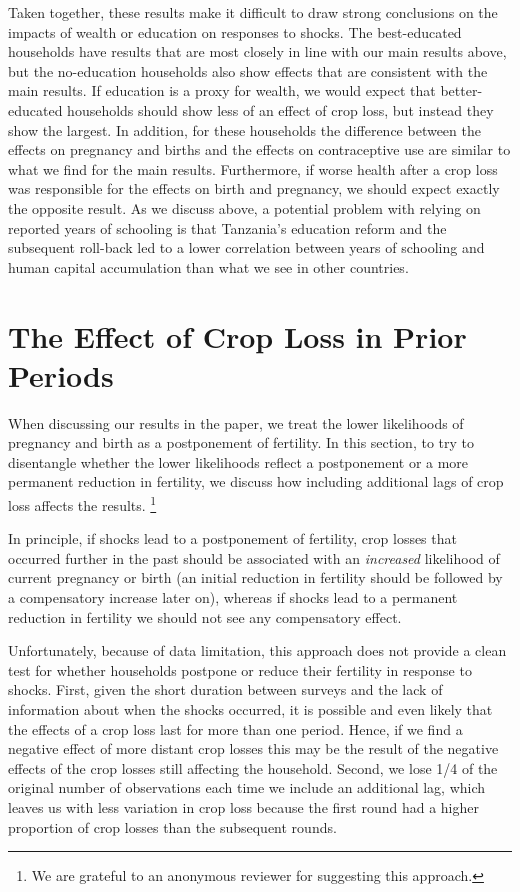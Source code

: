 \documentclass[letterpaper,12pt]{article}
\begin{document}
Taken together, these results make it difficult to draw strong
conclusions on the impacts of wealth or education on responses to shocks.
The best-educated households have results that are
most closely in line with our main results above, but 
the no-education households also show effects that are
consistent with the main results.
If education is a proxy for wealth, we would 
expect that better-educated households should show less
of an effect of crop loss, but instead they show the largest.
In addition, for these households the difference between
the effects on pregnancy and births and the effects on
contraceptive use are similar to what we find for the main results.
Furthermore, if worse health after a crop loss was responsible for the
effects on birth and pregnancy, we should expect exactly
the opposite result.
As we discuss above, a potential problem with relying on 
reported years of schooling is that Tanzania's education reform and the
subsequent roll-back led to a lower correlation between years of
schooling and human capital accumulation than what we see in other
countries.

\section{The Effect of Crop Loss in Prior Periods}

When discussing our results in the paper, we treat the 
lower likelihoods of pregnancy and birth as a postponement 
of fertility.
In this section, to try to disentangle whether the lower 
likelihoods reflect a postponement or a more permanent reduction 
in fertility, we discuss how including additional lags
of crop loss affects the results.%
\footnote{
We are grateful to an anonymous reviewer for suggesting 
this approach.
}

In principle, if shocks lead to a postponement of fertility,
crop losses that occurred further in the past should be
associated with an \emph{increased} likelihood of current pregnancy 
or birth (an initial reduction in fertility should be followed
by a compensatory increase later on), 
whereas if shocks lead to a permanent reduction in fertility we
should not see any compensatory effect.

Unfortunately, because of data limitation, this approach does not 
provide a clean test for whether households 
postpone or reduce their fertility in response to shocks.
First, given the short duration between surveys and the lack of 
information about when the shocks occurred, it is possible and
even likely that the effects of a crop loss last for more than one period.
Hence, if we find a negative effect of more distant crop losses
this may be the result of the negative effects of the crop losses
still affecting the household.
Second, we lose 1/4 of the original number of observations each 
time we include an additional lag, which leaves us with less variation 
in crop loss because the first round had a higher proportion of crop 
losses than the subsequent rounds.
\end{document}
